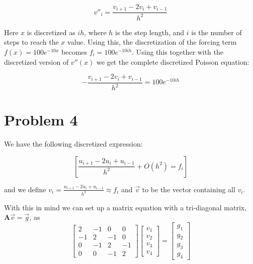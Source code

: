 \documentclass[english,notitlepage]{article}  %
\begin{document}
    \begin{equation*}
        v''_i = \frac{v_{i+1} - 2v_i + v_{i-1}}{h^2}
    \end{equation*}

    Here $x$ is discretized as $i h$, where $h$ is the step length, and $i$ is the
    number of steps to reach the $x$ value. Using this, the discretization of the
    forcing term $f(x) = 100 e^{-10 x}$ becomes $f_i = 100 e^{-10 ih}$. Using this
    together with the discretized version of $v''(x)$ we get the complete
    discretized Poisson equation:

    \begin{equation}
        -\frac{v_{i+1} - 2v_i + v_{i-1}}{h^2} = 100 e^{-10 i h}
    \end{equation}

\section*{Problem 4}

    We have the following discretized expression:

    \begin{equation}\label{eq:second_derr}
        \left[\frac{u_{i+1} - 2u_i + u_{i-1}}{h^2} + O(h^2) = f_i\right]
    \end{equation}

    and we define $v_i = \frac{u_{i+1} - 2u_i + u_{i-1}}{h^2} \approx f_i$ and $\vec{v}$ to be the vector containing all $v_i$.

    With this in mind we can set up a matrix equation with a tri-diagonal matrix, $\boldsymbol{A}\vec{v} = \vec{g}$, as
    \begin{equation}\label{eq:mat_Avg}
        \begin{bmatrix}
            2 & -1 & 0 & 0 \\
            -1 & 2 & -1 & 0 \\
            0 & -1 & 2 & -1 \\
            0 & 0 & -1 & 2
        \end{bmatrix} \begin{bmatrix}
            v_1\\
            v_2\\
            v_3\\
            v_4
        \end{bmatrix} = \begin{bmatrix}
            g_1\\
            g_2\\
            g_3\\
            g_4
        \end{bmatrix}
    \end{equation}
\end{document}
